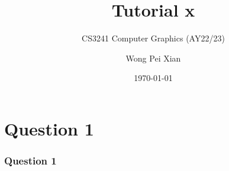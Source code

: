 \documentclass{beamer}
\title{Tutorial x}
\subtitle{CS3241 Computer Graphics (AY22/23)}
\date{\today}
\author{Wong Pei Xian}
\institute[]{\email{e0389023@u.nus.edu}}
\begin{document}
\frame[plain]{\titlepage}

\section{Question 1}

\begin{frame}
    \frametitle{Question 1}
\end{frame}
\end{document}
